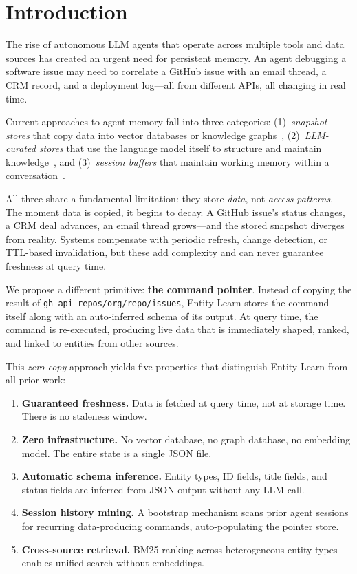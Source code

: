 \documentclass[11pt,twocolumn]{article}
\begin{document}
\section{Introduction}
\label{sec:intro}

The rise of autonomous LLM agents that operate across multiple tools and data sources has created an urgent need for persistent memory.
An agent debugging a software issue may need to correlate a GitHub issue with an email thread, a CRM record, and a deployment log---all from different APIs, all changing in real time.

Current approaches to agent memory fall into three categories:
(1)~\emph{snapshot stores} that copy data into vector databases or knowledge graphs~\cite{amem2025, zep2025, magma2026},
(2)~\emph{LLM-curated stores} that use the language model itself to structure and maintain knowledge~\cite{byterover2026, memos2025},
and (3)~\emph{session buffers} that maintain working memory within a conversation~\cite{memtool2025, memoryr1_2025}.

All three share a fundamental limitation: they store \emph{data}, not \emph{access patterns}.
The moment data is copied, it begins to decay.
A GitHub issue's status changes, a CRM deal advances, an email thread grows---and the stored snapshot diverges from reality.
Systems compensate with periodic refresh, change detection, or TTL-based invalidation, but these add complexity and can never guarantee freshness at query time.

We propose a different primitive: \textbf{the command pointer}.
Instead of copying the result of \texttt{gh api repos/org/repo/issues}, Entity-Learn stores the command itself along with an auto-inferred schema of its output.
At query time, the command is re-executed, producing live data that is immediately shaped, ranked, and linked to entities from other sources.

This \emph{zero-copy} approach yields five properties that distinguish Entity-Learn from all prior work:

\begin{enumerate}[leftmargin=1.5em,itemsep=2pt]
  \item \textbf{Guaranteed freshness.} Data is fetched at query time, not at storage time. There is no staleness window.
  \item \textbf{Zero infrastructure.} No vector database, no graph database, no embedding model. The entire state is a single JSON file.
  \item \textbf{Automatic schema inference.} Entity types, ID fields, title fields, and status fields are inferred from JSON output without any LLM call.
  \item \textbf{Session history mining.} A bootstrap mechanism scans prior agent sessions for recurring data-producing commands, auto-populating the pointer store.
  \item \textbf{Cross-source retrieval.} BM25 ranking across heterogeneous entity types enables unified search without embeddings.
\end{enumerate}
\end{document}
